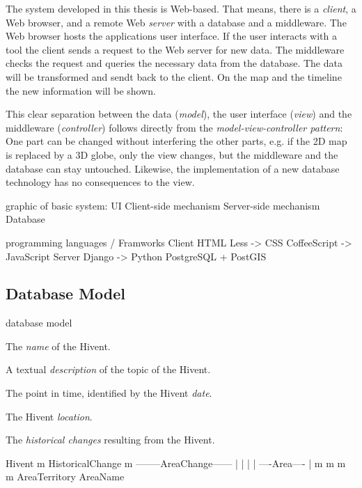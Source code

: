 The system developed in this thesis is Web-based. That means, there is a \emph{client}, a Web browser, and a remote Web \emph{server} with a database and a middleware. The Web browser hosts the applications user interface. If the user interacts with a tool the client sends a request to the Web server for new data. The middleware checks the request and queries the necessary data from the database. The data will be transformed and sendt back to the client. On the map and the timeline the new information will be shown.

This clear separation between the data (\emph{model}), the user interface (\emph{view}) and the middleware (\emph{controller}) follows directly from the \emph{model-view-controller pattern}: One part can be changed without interfering the other parts, e.g. if the 2D map is replaced by a 3D globe, only the view changes, but the middleware and the database can stay untouched. Likewise, the implementation of a new database technology has no consequences to the view.

graphic of basic system:
UI
Client-side mechanism
Server-side mechanism
Database

programming languages / Framworks
Client                    HTML
          Less ->         CSS
          CoffeeScript -> JavaScript
Server    Django ->       Python
                          PostgreSQL
                          + PostGIS


\subsection{Database Model} %
\label{sub:database_model}

database model

\begin{compactenum}
  \item The \emph{name} of the Hivent.
  \item A textual \emph{description} of the topic of the Hivent.
  \item The point in time, identified by the Hivent \emph{date}.
  \item The Hivent \emph{location}.
  \item The \emph{historical changes} resulting from the Hivent.
\end{compactenum}


           Hivent
             m
       HistoricalChange
             m
  --------AreaChange------
  |          |           |
  |     ----Area----     |
  m     m          m     m
AreaTerritory      AreaName

